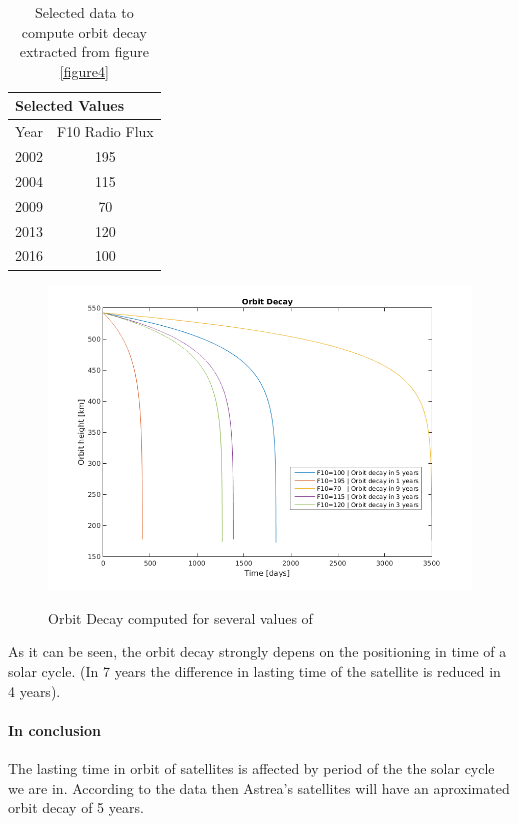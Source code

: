 \begin{table}[]
\centering
\caption{Selected data to compute orbit decay extracted from figure \ref{figure4}}
\label{OrbDecCompT}
\begin{tabular}{|l|c|}
\hline
\multicolumn{2}{|l|}{Selected Values}      \\ \hline
Year & \multicolumn{1}{l|}{F10 Radio Flux} \\ \hline
2002 & 195                                 \\ \hline
2004 & 115                                 \\ \hline
2009 & 70                                  \\ \hline
2013 & 120                                 \\ \hline
2016 & 100                                 \\ \hline
\end{tabular}
\end{table}  
\begin{figure}[H] %
	\centering
	\includegraphics[width=.8\textwidth]{OrbitDecayComp.png}\\
	\caption{Orbit Decay computed for several values of }
	\label{fig:OrbitDecayComp} 
\end{figure}

As it can be seen, the orbit decay strongly depens on the positioning in time of a solar cycle. (In 7 years the difference in lasting time of the satellite is reduced in 4 years).

\paragraph{In conclusion}
The lasting time in orbit of satellites is affected by period of the the solar cycle we are in. According to the data then Astrea's satellites will have an aproximated orbit decay of 5 years.


 
